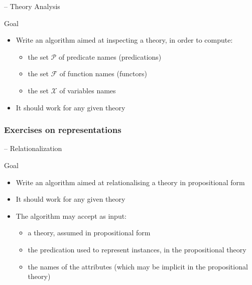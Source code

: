 \documentclass[presentation]{beamer}\mode<presentation>{\usetheme{AMSBolognaFC}}
\begin{document}
\startExercise{}

\begin{frame}{\currentExercise{} -- Theory Analysis}
    \label{slide:second-exercise-on-clauses}
    \begin{block}{Goal}
        \begin{itemize}
            \item Write an algorithm aimed at inspecting a theory, in order to compute:
            \begin{itemize}
                \item the set $\mathcal{P}$ of predicate names (predications)
                \item the set $\mathcal{F}$ of function names (functors)
                \item the set $\mathcal{X}$ of variables names 
            \end{itemize}
            \item It should work \alert{for any given theory}
        \end{itemize}
    \end{block}
\end{frame}

\subsubsection{Exercises on representations}

\startExercise{}

\begin{frame}{\currentExercise{} -- Relationalization}
    \begin{block}{Goal}
        \begin{itemize}
            \item Write an algorithm aimed at relationalising a theory in propositional form
            
            \item It should work \alert{for any given theory}
            
            \item The algorithm may accept as input:
            \begin{itemize}
                \item a theory, assumed in propositional form
                \item the predication used to represent instances, in the propositional theory
                \item the names of the attributes (which may be implicit in the propositional theory)
            \end{itemize}
        \end{itemize}
    \end{block}
\end{frame}
\end{document}
